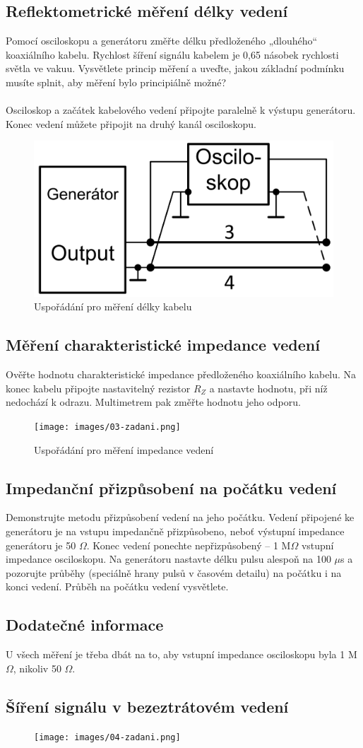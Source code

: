 \subsection{Reflektometrické měření délky vedení}
Pomocí osciloskopu a generátoru změřte délku předloženého „dlouhého“ koaxiálního kabelu. Rychlost šíření
signálu kabelem je 0,65 násobek rychlosti světla ve vakuu. Vysvětlete princip měření a uveďte, jakou základní
podmínku musíte splnit, aby měření bylo principiálně možné?\\\\
Osciloskop a začátek kabelového vedení připojte paralelně k výstupu generátoru. Konec vedení můžete připojit
na druhý kanál osciloskopu.
\begin{figure}[h]
\centering
\includegraphics[width=12cm]{images/02-zadani.png}
\caption{Uspořádání pro měření délky kabelu}
\label{fig:2}
\end{figure}
\subsection{Měření charakteristické impedance vedení}
Ověřte hodnotu charakteristické impedance předloženého koaxiálního kabelu. Na konec kabelu připojte
nastavitelný rezistor $R_Z$ a nastavte hodnotu, při níž nedochází k odrazu. Multimetrem pak změřte hodnotu jeho
odporu.
\begin{figure}[h]
\centering
\texttt{[image: images/03-zadani.png]}
\caption{Uspořádání pro měření impedance vedení}
\label{fig:3}
\end{figure}
\subsection{Impedanční přizpůsobení na počátku vedení}
Demonstrujte metodu přizpůsobení vedení na jeho počátku. Vedení připojené ke generátoru je na vstupu
impedančně přizpůsobeno, neboť výstupní impedance generátoru je 50 $\Omega$. Konec vedení ponechte
nepřizpůsobený – 1 M$\Omega$ vstupní impedance osciloskopu. Na generátoru nastavte délku pulsu alespoň na 100 $\mu$s
a pozorujte průběhy (speciálně hrany pulsů v časovém detailu) na počátku i na konci vedení. Průběh na počátku
vedení vysvětlete.
\subsection{Dodatečné informace}
U všech měření je třeba dbát na to, aby vstupní impedance osciloskopu byla 1 M$\Omega$, nikoliv 50 $\Omega$.
\subsection{Šíření signálu v bezeztrátovém vedení}
\begin{figure}[h]
\centering
\texttt{[image: images/04-zadani.png]}
\caption{}
\label{fig:4}
\end{figure}